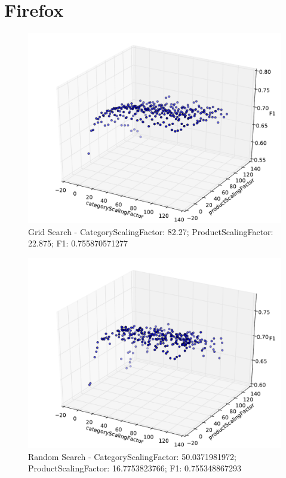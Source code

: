 \documentclass{article}
\begin{document}
\section{Firefox}

\begin{figure}[!htb]
\centering
\includegraphics[width=\textwidth]{firefox/g_firefox.pdf}
\caption{Grid Search - CategoryScalingFactor: 82.27; ProductScalingFactor: 22.875; F1: 0.755870571277 }
\label{fig:FGrid-Search}
\end{figure}

\begin{figure}[!htb]
\centering
\includegraphics[width=\textwidth]{firefox/rnd_firefox.pdf}
\caption{Random Search - CategoryScalingFactor: 50.0371981972; ProductScalingFactor: 16.7753823766; F1: 0.755348867293 }
\label{fig:FRandom-Search}
\end{figure}
\end{document}
